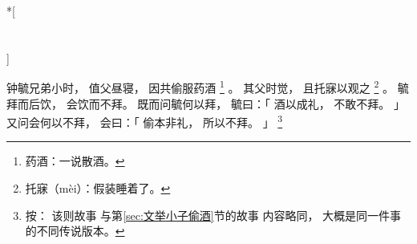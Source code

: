 
\switchcolumn[0]*[\section{}]

钟毓兄弟小时，
值父昼寝，
因共偷服药酒%
\footnote{%
    药酒：一说散酒。
}%
。
其父时觉，
且托寐以观之%
\footnote{%
    托寐（mèi）：假装睡着了。
}%
。
毓拜而后饮，
会饮而不拜。
既而问毓何以拜，
毓曰：「
    酒以成礼，
    不敢不拜。
」
又问会何以不拜，
会曰：「
    偷本非礼，
    所以不拜。
」%
\footnote{%
    按：
        该则故事
        与第\ref{sec:文举小子偷酒}节的故事
        内容略同，
        大概是同一件事的不同传说版本。
}%

\switchcolumn



